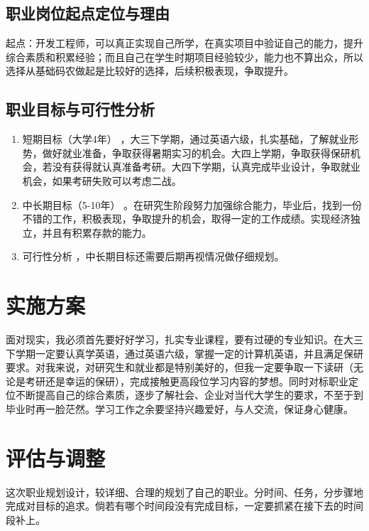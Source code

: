 \documentclass{article}
\begin{document}
\subsection{职业岗位起点定位与理由}
起点：开发工程师，可以真正实现自己所学，在真实项目中验证自己的能力，提升综合素质和积累经验；而且自己在学生时期项目经验较少，能力也不算出众，所以选择从基础码农做起是比较好的选择，后续积极表现，争取提升。\par
\subsection{职业目标与可行性分析}
\par
\par 
\begin{enumerate}[(1)]
	\item 短期目标（大学4年）
	，大三下学期，通过英语六级，扎实基础，了解就业形势，做好就业准备，争取获得暑期实习的机会。大四上学期，争取获得保研机会，若没有获得就认真准备考研。大四下学期，认真完成毕业设计，争取就业机会，如果考研失败可以考虑二战。
	\item 中长期目标（5-10年）
	。在研究生阶段努力加强综合能力，毕业后，找到一份不错的工作，积极表现，争取提升的机会，取得一定的工作成绩。实现经济独立，并且有积累存款的能力。
	\item 可行性分析
	，中长期目标还需要后期再视情况做仔细规划。
\end{enumerate}



\section{实施方案}
面对现实，我必须首先要好好学习，扎实专业课程，要有过硬的专业知识。在大三下学期一定要认真学英语，通过英语六级，掌握一定的计算机英语，并且满足保研要求。对我来说，对研究生和就业都是特别美好的，但我一定要争取一下读研（无论是考研还是幸运的保研），完成接触更高段位学习内容的梦想。同时对标职业定位不断提高自己的综合素质，逐步了解社会、企业对当代大学生的要求，不至于到毕业时再一脸茫然。学习工作之余要坚持兴趣爱好，与人交流，保证身心健康。\par
\section{评估与调整}
这次职业规划设计，较详细、合理的规划了自己的职业。分时间、任务，分步骤地完成对目标的追求。倘若有哪个时间段没有完成目标，一定要抓紧在接下去的时间段补上。\par 
\end{document}
